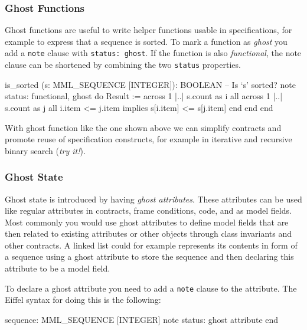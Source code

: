 \documentclass[a4paper,12pt]{article}
\newcommand{\e}[1]{\mbox{\lstinline[language=Eiffel]|#1|}}
\begin{document}
\subsubsection*{Ghost Functions}

Ghost functions are useful to write helper functions usable in specifications, for example to express that a sequence is sorted. To mark a function as \emph{ghost} you add a \e{note} clause with \e{status: ghost}. If the function is also \emph{functional}, the note clause can be shortened by combining the two \e{status} properties.

\begin{erunning}
is_sorted (s: MML_SEQUENCE [INTEGER]): BOOLEAN
		-- Is `s' sorted?
	note
		status: functional, ghost
	do
		Result := across 1 |..| s.count as i all
		            across 1 |..| s.count as j all
		              i.item <= j.item implies s[i.item] <= s[j.item] end end
	end
\end{erunning}

With ghost function like the one shown above we can simplify contracts and promote reuse of specification constructs, for example in iterative and recursive binary search (\emph{try it!}).

\subsubsection*{Ghost State}

Ghost state is introduced by having \emph{ghost attributes}. These attributes can be used like regular attributes in contracts, frame conditions, code, and as model fields. Most commonly you would use ghost attributes to define model fields that are then related to existing attributes or other objects through class invariants and other contracts. A linked list could for example represents its contents in form of a sequence using a ghost attribute to store the sequence and then declaring this attribute to be a model field.

To declare a ghost attribute you need to add a \e{note} clause to the attribute. The Eiffel syntax for doing this is the following:

\begin{erunning}
sequence: MML_SEQUENCE [INTEGER]
	note status: ghost
	attribute
	end
\end{erunning}
\end{document}
